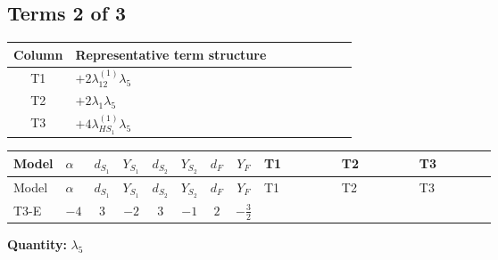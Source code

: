 \documentclass[8pt]{article}
\begin{document}
\begin{landscape}
\subsection*{Terms 2 of 3}
\begin{center}
\begin{tabular}{@{}c >{\raggedright\arraybackslash}p{0.82\linewidth}@{}}
\toprule
Column & Representative term structure \\
\midrule
T1 & \(\displaystyle +2 {\lambda_{12}^{(1)}} {\lambda_5}\) \\
\midrule
T2 & \(\displaystyle +2 {\lambda_1} {\lambda_5}\) \\
\midrule
T3 & \(\displaystyle +4 {\lambda_{HS_1}^{(1)}} {\lambda_5}\) \\
\midrule
\bottomrule
\end{tabular}
\end{center}
\smallskip
\tiny
\begin{longtable}{@{}llcccccc >{\raggedright\arraybackslash}p{0.21\linewidth} >{\raggedright\arraybackslash}p{0.21\linewidth} >{\raggedright\arraybackslash}p{0.21\linewidth}@{}}
\toprule
Model & $\alpha$ & $d_{S_1}$ & $Y_{S_1}$ & $d_{S_2}$ & $Y_{S_2}$ & $d_F$ & $Y_F$ & T1 & T2 & T3 \\
\midrule
\endfirsthead
\toprule
Model & $\alpha$ & $d_{S_1}$ & $Y_{S_1}$ & $d_{S_2}$ & $Y_{S_2}$ & $d_F$ & $Y_F$ & T1 & T2 & T3 \\
\midrule
\endhead
T3-E & $-4$ & $3$ & $-2$ & $3$ & $-1$ & $2$ & $-\frac{3}{2}$ & \scriptsize\adjustbox{max width=\linewidth}{$\begin{gathered} +2 {\lambda_{12}^{(1)}} {\lambda_5}\end{gathered}$} & \scriptsize\adjustbox{max width=\linewidth}{$\begin{gathered} +2 {\lambda_1} {\lambda_5}\end{gathered}$} & \scriptsize\adjustbox{max width=\linewidth}{$\begin{gathered} +4 {\lambda_{HS_1}^{(1)}} {\lambda_5}\end{gathered}$} \\
\midrule
\bottomrule
\end{longtable}
\clearpage
\noindent\textbf{Quantity: }$\lambda_5$\par\smallskip

\end{landscape}
\end{document}
